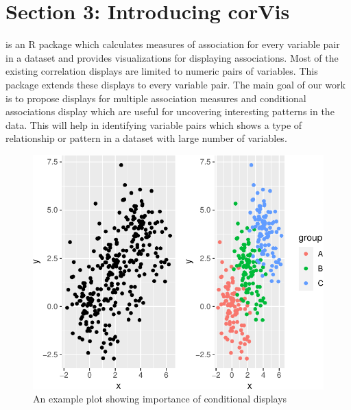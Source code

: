 \hypertarget{section-3-introducing-corvis}{%
\section{Section 3: Introducing
corVis}\label{section-3-introducing-corvis}}

 is an R package which calculates measures of
association for every variable pair in a dataset and provides
visualizations for displaying associations. Most of the existing
correlation displays are limited to numeric pairs of variables. This
package extends these displays to every variable pair. The main goal of
our work is to propose displays for multiple association measures and
conditional associations display which are useful for uncovering
interesting patterns in the data. This will help in identifying variable
pairs which shows a type of relationship or pattern in a dataset with
large number of variables.

\begin{Schunk}
\begin{figure}

{\centering \includegraphics{rj_paper_files/figure-latex/motivation2-1} 

}

\caption[An example plot showing importance of conditional displays]{An example plot showing importance of conditional displays}\label{fig:motivation2}
\end{figure}
\end{Schunk}

